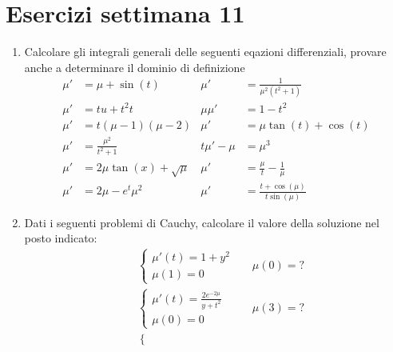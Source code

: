 \section{Esercizi settimana 11}
\begin{enumerate}
	\item Calcolare gli integrali generali delle seguenti eqazioni differenziali, provare anche a determinare il dominio di definizione
	      \begin{align*}
		      \mu ' & = \mu  + \sin\left(t\right)                      & \mu '         & = \frac{1}{ \mu ^2  \left(t^2  + 1\right) }                   \\
		      \mu'  & = t u + t^2   t                                  & \mu \mu '     & = 1 - t^2                                                     \\
		      \mu ' & = t \left( \mu  - 1\right) \left( \mu  -2\right) & \mu '         & = \mu \tan \left(t\right) + \cos \left(t\right)               \\
		      \mu ' & = \frac{\mu ^2 }{t^2  + 1}                       & t \mu ' - \mu & = \mu ^3                                                      \\
		      \mu ' & = 2 \mu  \tan  \left(x\right) + \sqrt{\mu }      & \mu '         & = \frac{\mu}{t} - \frac{1}{\mu }                              \\
		      \mu ' & = 2 \mu  - e^{t} \mu ^2                          & \mu '         & = \frac{t + \cos \left(\mu \right)}{t \sin \left(\mu \right)}
	      \end{align*}
	\item Dati i seguenti problemi di Cauchy, calcolare il valore della soluzione nel posto indicato:
	      \begin{align*}
		       &
		      \begin{cases}
			      \mu ' \left(t\right) = 1 + y^2 \\
			      \mu \left(1\right) = 0
		      \end{cases}
		       &   & \mu \left(0\right) = ?             \\
		       &
		      \begin{cases}
			      \mu ' \left(t\right) = \frac{2e^{-2 \mu }}{y + t^2 } \\
			      \mu \left(0\right) = 0
		      \end{cases}
		       &   & \mu \left(3\right) = ?             \\
		       &
		      \begin{cases}

\end{cases}
\end{align*}
\end{enumerate}
